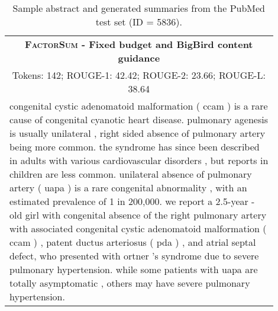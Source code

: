 \documentclass[11pt,table]{article}
\newcommand{\modelname}{FactorSum}
\begin{document}
\begin{table*}[ht]
\begin{tabular}{p{0.9\linewidth}}
    \midrule
    \multicolumn{1}{c}{\textbf{\textsc{\modelname} - Fixed budget and BigBird content guidance}} \\
    \multicolumn{1}{c}{Tokens: 142; ROUGE-1: 42.42; ROUGE-2: 23.66; ROUGE-L: 38.64} \\
    \midrule
    congenital cystic adenomatoid malformation ( ccam ) is a rare cause of congenital cyanotic heart disease. pulmonary agenesis is usually unilateral , right sided absence of pulmonary artery being more common. the syndrome has since been described in adults with various cardiovascular disorders , but reports in children are less common. unilateral absence of pulmonary artery ( uapa ) is a rare congenital abnormality , with an estimated prevalence of 1 in 200,000. we report a 2.5-year - old girl with congenital absence of the right pulmonary artery with associated congenital cystic adenomatoid malformation ( ccam ) , patent ductus arteriosus ( pda ) , and atrial septal defect, who presented with ortner 's syndrome due to severe pulmonary hypertension. while some patients with uapa are totally asymptomatic , others may have severe pulmonary hypertension.\\
    \bottomrule
  \end{tabular}
  \caption{Sample abstract and generated summaries from the PubMed test set (ID = 5836).} \label{tab:summary_sample_pubmed1}
\end{table*}
\end{document}
